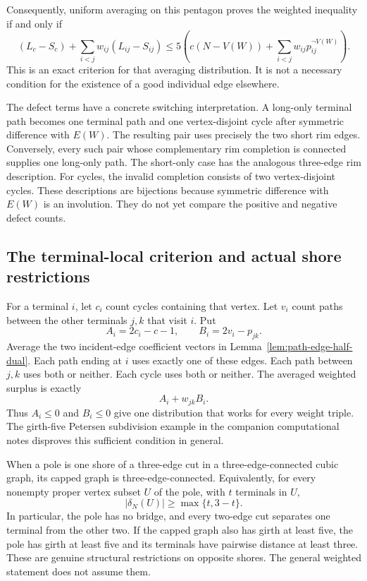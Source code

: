Consequently, uniform averaging on this pentagon proves the weighted inequality if and only if
\begin{equation}\label{eq:path-edge-half-pentagon-target}
 (L_c-S_c)+\sum_{i<j}w_{ij}(L_{ij}-S_{ij})
 \le5\left(c(N-V(W))+\sum_{i<j}w_{ij}p_{ij}^{\neg V(W)}\right).
\end{equation}
This is an exact criterion for that averaging distribution.
It is not a necessary condition for the existence of a good individual edge elsewhere.

The defect terms have a concrete switching interpretation.
A long-only terminal path becomes one terminal path and one vertex-disjoint cycle after symmetric difference with $E(W)$.
The resulting pair uses precisely the two short rim edges.
Conversely, every such pair whose complementary rim completion is connected supplies one long-only path.
The short-only case has the analogous three-edge rim description.
For cycles, the invalid completion consists of two vertex-disjoint cycles.
These descriptions are bijections because symmetric difference with $E(W)$ is an involution.
They do not yet compare the positive and negative defect counts.

\subsection{The terminal-local criterion and actual shore restrictions}

For a terminal $i$, let $c_i$ count cycles containing that vertex.
Let $v_i$ count paths between the other terminals $j,k$ that visit $i$.
Put
\[
 A_i=2c_i-c-1,\qquad B_i=2v_i-p_{jk}.
\]
Average the two incident-edge coefficient vectors in Lemma~\ref{lem:path-edge-half-dual}.
Each path ending at $i$ uses exactly one of these edges.
Each path between $j,k$ uses both or neither.
Each cycle uses both or neither.
The averaged weighted surplus is exactly
\[
 A_i+w_{jk}B_i.
\]
Thus $A_i\le0$ and $B_i\le0$ give one distribution that works for every weight triple.
The girth-five Petersen subdivision example in the companion computational notes disproves this sufficient condition in general.

When a pole is one shore of a three-edge cut in a three-edge-connected cubic graph, its capped graph is three-edge-connected.
Equivalently, for every nonempty proper vertex subset $U$ of the pole, with $t$ terminals in $U$,
\[
 |\delta_N(U)|\ge\max\{t,3-t\}.
\]
In particular, the pole has no bridge, and every two-edge cut separates one terminal from the other two.
If the capped graph also has girth at least five, the pole has girth at least five and its terminals have pairwise distance at least three.
These are genuine structural restrictions on opposite shores.
The general weighted statement does not assume them.

